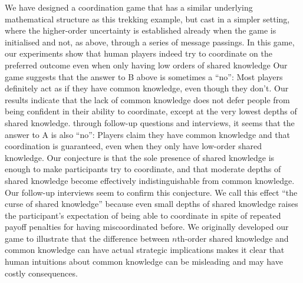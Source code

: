 We have designed a coordination game that has a similar underlying mathematical structure as this trekking example, but cast in a simpler setting, where the higher-order uncertainty is established already when the game is initialised and not, as above, through a series of message passings. In this game, our experiments show that human players indeed try to coordinate on the preferred outcome even when only having low orders of shared knowledge Our game suggests that the answer to B above is sometimes a ``no'': Most players definitely act as if they have common knowledge, even though they don't. Our results indicate that the lack of common knowledge does not defer people from being confident in their ability to coordinate, except at the very lowest depths of shared knowledge.  through follow-up questions and interviews, it seems that the answer to A is also ``no'': Players claim they have common knowledge and that coordination is guaranteed, even when they only have low-order shared knowledge. Our conjecture is that the sole presence of shared knowledge is enough to make participants try to coordinate, and that moderate depths of shared knowledge become effectively indistinguishable from common knowledge. Our follow-up interviews seem to confirm this conjecture. We call this effect ``the curse of shared knowledge'' because even small depths of shared knowledge raises the participant's expectation of being able to coordinate in spite of repeated payoff penalties for having miscoordinated before. We originally developed our game to illustrate that the difference between $n$th-order shared knowledge and common knowledge can have actual strategic implications\modified{;}  makes it clear that human intuitions about common knowledge can be misleading and may have costly consequences.

